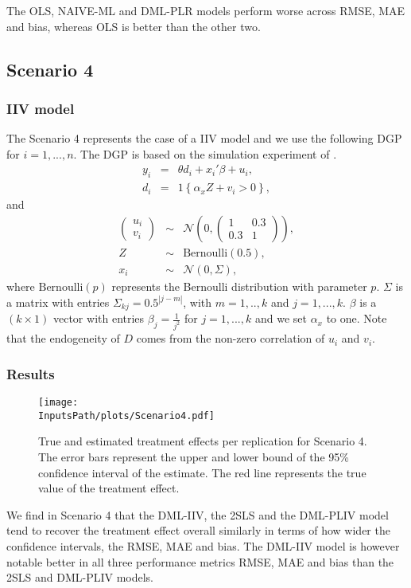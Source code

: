\documentclass[10pt]{article}
\newcommand*{\InputsFolderPath}{C:/DEV/DML/src/data/}
\newcommand*{\InputsPath}{\InputsFolderPath/20221110/}
\begin{document}
The OLS, NAIVE-ML and DML-PLR models perform worse across RMSE, MAE and bias, whereas OLS is better than the other two.

\subsection{Scenario 4}
\subsubsection{IIV model}
The Scenario 4 represents the case of a IIV model and we use the following DGP for $i=1,...,n$.
The DGP is based on the simulation experiment of \cite{Farb2020}.
\begin{eqnarray*}\label{dgp_4.1}
y_i &=& \theta d_i + x_i' \beta + u_i, \\	
d_i &=& 1\left\lbrace \alpha_x Z + v_i > 0 \right\rbrace,
\end{eqnarray*}
and
\begin{eqnarray*}\label{dgp_4.2}
\left(\begin{matrix} u_i \\ v_i \end{matrix} \right) &\sim&
\mathcal{N}\left(0, \left(\begin{matrix} 1 & 0.3 \\ 0.3 & 1 \end{matrix} \right) \right), \\
Z &\sim& \text{Bernoulli}(0.5), \\
x_i &\sim& \mathcal{N}(0, \Sigma),
\end{eqnarray*}
where $\text{Bernoulli}(p)$ represents the Bernoulli distribution with parameter $p$. 
$\Sigma$ is a matrix with entries $\Sigma_{kj} = 0.5^{|j-m|}$, with $m=1,..,k$ and $j=1,...,k$.
$\beta$ is a $(k \times 1)$ vector with entries $\beta_j=\frac{1}{j^2}$ for $j=1,...,k$ and we set $\alpha_x$ to one.
Note that the endogeneity of $D$ comes from the non-zero correlation of $u_i$ and $v_i$.
\subsubsection{Results}
\begin{figure}[H]
	\begin{center}
		\texttt{[image: \\InputsPath/plots/Scenario4.pdf]}
		\caption{True and estimated treatment effects per replication for Scenario 4. The error bars represent the upper and lower bound of the 95\% confidence interval of the estimate. The red line represents the true value of the treatment effect.}
		\label{Scenario 4}
	\end{center}
\end{figure}

We find in Scenario 4 that the DML-IIV, the 2SLS and the DML-PLIV model tend to recover the treatment effect overall similarly in terms of how wider the confidence intervals, the RMSE, MAE and bias.  
The DML-IIV model is however notable better in all three performance metrics RMSE, MAE and bias than the 2SLS and DML-PLIV models.
\end{document}
